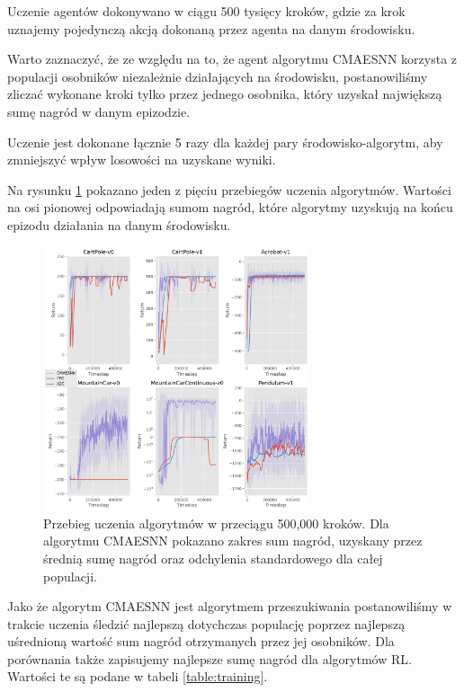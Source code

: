 \documentclass[12pt,a4paper]{article}
\begin{document}
Uczenie agentów dokonywano w ciągu 500 tysięcy kroków,
gdzie za krok uznajemy pojedynczą akcją dokonaną przez
agenta na danym środowisku.

Warto zaznaczyć, że ze względu na to, że agent
algorytmu CMAESNN korzysta z populacji osobników niezależnie
działających na środowisku, postanowiliśmy zliczać wykonane kroki tylko
przez jednego osobnika, który uzyskał największą sumę nagród
w danym epizodzie.

Uczenie jest dokonane łącznie 5 razy dla każdej pary środowisko-algorytm,
aby zmniejszyć wpływ losowości na uzyskane wyniki.

Na rysunku \ref{fig:training} pokazano jeden z pięciu przebiegów uczenia
algorytmów. Wartości na osi pionowej odpowiadają sumom nagród,
które algorytmy uzyskują na końcu epizodu działania na danym środowisku.

\begin{figure}[!h]
  \centering
  \includegraphics[width=0.7\textwidth]{../plotting/plots/plot_all0.pdf}
  \caption{Przebieg uczenia algorytmów w przeciągu 500,000 kroków.
    Dla algorytmu CMAESNN pokazano zakres sum nagród, uzyskany przez
    średnią sumę nagród oraz odchylenia standardowego dla całej populacji.}
  \label{fig:training}
\end{figure}

Jako że algorytm CMAESNN jest algorytmem przeszukiwania postanowiliśmy w trakcie
uczenia śledzić najlepszą dotychczas populację poprzez najlepszą uśrednioną wartość
sum nagród otrzymanych przez jej osobników. Dla porównania także zapisujemy
najlepsze sumę nagród dla algorytmów RL. Wartości te są podane w tabeli
\ref{table:training}.
\end{document}
